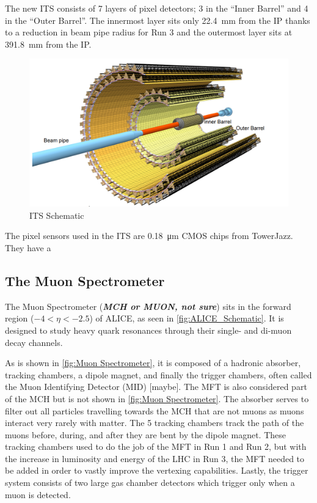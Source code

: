\documentclass[11pt]{article}
\numberwithin{equation}{section}
\numberwithin{figure}{section}
\numberwithin{table}{section}
\begin{document}
The new ITS consists of 7 layers of pixel detectors; 3 in the ``Inner Barrel'' and 4 in the ``Outer Barrel''. The innermost layer sits only \SI{22.4}{\milli\metre} from the IP thanks to a reduction in beam pipe radius for Run 3 and the outermost layer sits at \SI{391.8}{\milli\metre} from the IP. 

\begin{figure}[h]
    \begin{center}
        \includegraphics[width=.8\textwidth]{Figs/ITS_Schematic.png}
        \caption{ITS Schematic}
        \label{fig:ITS_Schematic}
    \end{center}
\end{figure}

The pixel sensors used in the ITS are \SI{0.18}{\micro\metre} CMOS chips from TowerJazz. They have a 



\subsection{The Muon Spectrometer}
The Muon Spectrometer (\textit{\textbf{MCH or MUON, not sure}}) sits in the forward region ($-4<\eta<-2.5$) of ALICE, as seen in \cref{fig:ALICE_Schematic}. It is designed to study heavy quark resonances through their single- and di-muon decay channels.

As is shown in \cref{fig:Muon Spectrometer}, it is composed of a hadronic absorber, tracking chambers, a dipole magnet, and finally the trigger chambers, often called the Muon Identifying Detector (MID) [maybe]. The MFT is also considered part of the MCH but is not shown in \cref{fig:Muon Spectrometer}. The absorber serves to filter out all particles travelling towards the MCH that are not muons as muons interact very rarely with matter. The 5 tracking chambers track the path of the muons before, during, and after they are bent by the dipole magnet. These tracking chambers used to do the job of the MFT in Run 1 and Run 2, but with the increase in luminosity and energy of the LHC in Run 3, the MFT needed to be added in order to vastly improve the vertexing capabilities. Lastly, the trigger system consists of two large gas chamber detectors which trigger only when a muon is detected.
\end{document}
